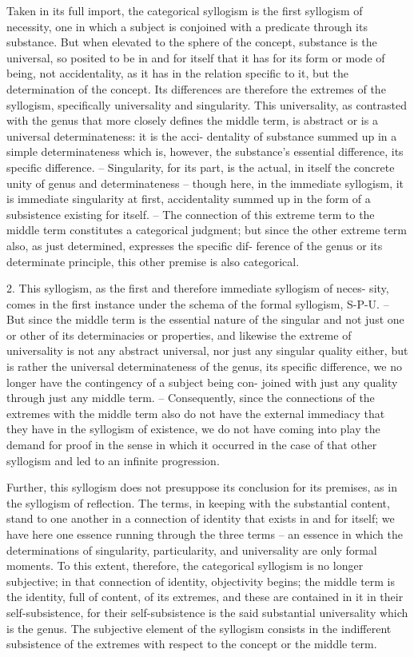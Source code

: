 Taken in its full import, the categorical syllogism is the first syllogism
of necessity, one in which a subject is conjoined with a predicate through
its substance. But when elevated to the sphere of the concept, substance
is the universal, so posited to be in and for itself that it has for its form
or mode of being, not accidentality, as it has in the relation specific to
it, but the determination of the concept. Its differences are therefore the
extremes of the syllogism, specifically universality and singularity. This
universality, as contrasted with the genus that more closely defines the
middle term, is abstract or is a universal determinateness: it is the acci-
dentality of substance summed up in a simple determinateness which
is, however, the substance’s essential difference, its specific difference. –
Singularity, for its part, is the actual, in itself the concrete unity of genus
and determinateness – though here, in the immediate syllogism, it is
immediate singularity at first, accidentality summed up in the form of
a subsistence existing for itself. – The connection of this extreme term
to the middle term constitutes a categorical judgment; but since the
other extreme term also, as just determined, expresses the specific dif-
ference of the genus or its determinate principle, this other premise is also
categorical.

2. This syllogism, as the first and therefore immediate syllogism of neces-
sity, comes in the first instance under the schema of the formal syllogism,
S-P-U. – But since the middle term is the essential nature of the singular
and not just one or other of its determinacies or properties, and likewise the
extreme of universality is not any abstract universal, nor just any singular
quality either, but is rather the universal determinateness of the genus, its
specific difference, we no longer have the contingency of a subject being con-
joined with just any quality through just any middle term. – Consequently,
since the connections of the extremes with the middle term also do not
have the external immediacy that they have in the syllogism of existence,
we do not have coming into play the demand for proof in the sense in
which it occurred in the case of that other syllogism and led to an infinite
progression.

Further, this syllogism does not presuppose its conclusion for its
premises, as in the syllogism of reflection. The terms, in keeping with
the substantial content, stand to one another in a connection of identity
that exists in and for itself; we have here one essence running through
the three terms – an essence in which the determinations of singularity,
particularity, and universality are only formal moments.
To this extent, therefore, the categorical syllogism is no longer subjective;
in that connection of identity, objectivity begins; the middle term is the
identity, full of content, of its extremes, and these are contained in it in their
self-subsistence, for their self-subsistence is the said substantial universality
which is the genus. The subjective element of the syllogism consists in the
indifferent subsistence of the extremes with respect to the concept or the
middle term.

